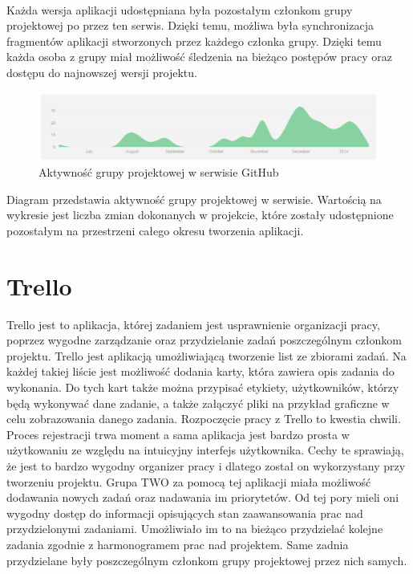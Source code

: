 \paragraph{}
Każda wersja aplikacji udostępniana była pozostałym członkom grupy projektowej po przez ten serwis. Dzięki temu, możliwa była synchronizacja fragmentów aplikacji stworzonych przez każdego członka grupy. Dzięki temu każda osoba z grupy miał możliwość śledzenia na bieżąco postępów pracy oraz dostępu do najnowszej wersji projektu. 
\begin{figure}[h]
	\centering
	\includegraphics[width=1.00\textwidth]{images/git.png}
	\caption{Aktywność grupy projektowej w serwisie GitHub}
\end{figure}

Diagram przedstawia aktywność grupy projektowej w serwisie. Wartością na wykresie jest liczba zmian dokonanych w projekcie, które zostały udostępnione pozostałym na przestrzeni całego  okresu tworzenia aplikacji. 

\section{Trello}
Trello jest to aplikacja, której zadaniem jest usprawnienie organizacji pracy, poprzez wygodne zarządzanie oraz przydzielanie zadań poszczególnym członkom projektu. Trello jest aplikacją umożliwiającą tworzenie list ze zbiorami zadań. Na każdej takiej liście jest możliwość dodania karty, która zawiera opis zadania do wykonania. Do tych kart także można przypisać etykiety, użytkowników, którzy będą wykonywać dane zadanie, a także załączyć pliki  na przykład graficzne w celu zobrazowania danego zadania. Rozpoczęcie pracy z Trello  to kwestia chwili. Proces rejestracji trwa moment a sama aplikacja jest bardzo prosta w użytkowaniu ze względu na intuicyjny interfejs użytkownika. Cechy te sprawiają, że jest to bardzo wygodny organizer pracy i dlatego został on wykorzystany przy tworzeniu projektu. Grupa TWO za pomocą tej aplikacji miała możliwość dodawania nowych zadań oraz nadawania im priorytetów. Od tej pory mieli oni wygodny dostęp do informacji opisujących stan zaawansowania prac nad przydzielonymi zadaniami. Umożliwiało im to na bieżąco przydzielać kolejne zadania zgodnie z harmonogramem prac nad projektem. Same zadnia przydzielane były poszczególnym członkom grupy projektowej przez nich samych. 

